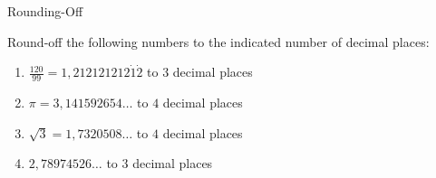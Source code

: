 \begin{wex}{Rounding-Off }
{Round-off the following numbers to the indicated number of decimal places:\par 
\label{m38349*id325219}\begin{enumerate}[itemsep=5pt, label=\textbf{\arabic*}. ] 
\item $\frac{120}{99}=1,212121212\dot{1}\dot{2}$ to $3$ decimal places
\label{m38349*uid6}\item $\pi =3,141592654\ldots$ to $4$ decimal places
\label{m38349*uid7}\item $\sqrt{3}=1,7320508\ldots$ to $4$ decimal places
\label{m38349*uid789}\item $2,78974526\ldots$ to $3$ decimal places\end{enumerate}}
{


}
\end{wex}
